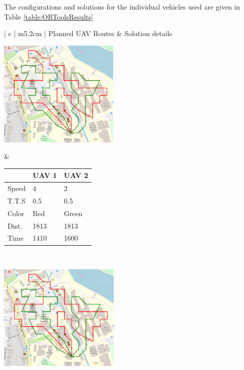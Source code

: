 The configurations and solutions for the individual vehicles used are given in Table \ref{table:ORToolsResults}
\begin{table}[h!]
  \centering
  \begin{tabular}{ | c | m{5.2cm} | }
    \hline
    Planned UAV Routes & Solution details \\
    \hline
    
    \begin{minipage}[c][53mm][c]{.6\textwidth}
      \includegraphics[width=\linewidth, height=51mm]{Chapters/MultiAgentCoverage/MultipleTravellingSalesman/Figs/ORToolsSolns/Example1.PNG}

    \end{minipage}
    &
    \small
    \begin{tabular}{m{10mm}|m{11mm} m{11mm}}
        & UAV 1 & UAV 2\\
        \hline
        Speed& 4 & 2 \\
        T.T.S & 0.5 & 0.5 \\
        Color & Red & Green \\
        \hline
        Dist.& 1813 & 1813 \\
        Time& 1410 & 1600 \\
    \end{tabular}
    \normalsize
    \\
    \hline
    \begin{minipage}[c][53mm][c]{.6\textwidth}
      \includegraphics[width=\linewidth, height=51mm]{Chapters/MultiAgentCoverage/MultipleTravellingSalesman/Figs/ORToolsSolns/Example2.PNG}


\end{minipage}
\end{tabular}
\end{table}
